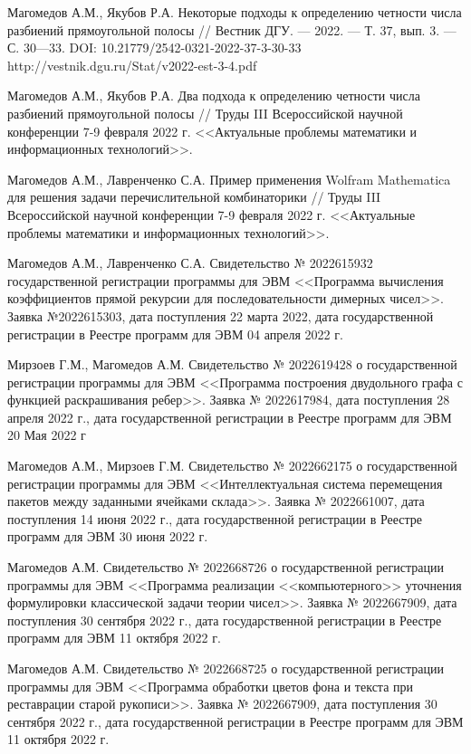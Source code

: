 \begin{thebibliography}{111}
Магомедов А.М., Якубов Р.А.
Некоторые подходы к определению четности числа разбиений прямоугольной полосы
//
Вестник ДГУ.
--- 2022.
--- Т. 37, вып. 3.
--- С. 30---33.
DOI: 10.21779/2542-0321-2022-37-3-30-33
http://vestnik.dgu.ru/Stat/v2022-est-3-4.pdf

Магомедов А.М., Якубов Р.А.
Два подхода к определению четности числа разбиений прямоугольной полосы
//
Труды III Всероссийской научной конференции 7-9 февраля 2022 г. <<Актуальные проблемы математики и информационных технологий>>.

Магомедов А.М., Лавренченко С.А.
Пример применения Wolfram Mathematica для решения задачи перечислительной комбинаторики
//
Труды III Всероссийской научной конференции 7-9 февраля 2022 г.  <<Актуальные проблемы математики и информационных технологий>>.

Магомедов А.М., Лавренченко С.А.
Свидетельство № 2022615932 государственной регистрации программы для ЭВМ <<Программа вычисления коэффициентов прямой рекурсии для последовательности димерных чисел>>. Заявка №2022615303, дата поступления 22 марта 2022, дата государственной регистрации в Реестре программ для ЭВМ 04 апреля 2022 г.

Мирзоев Г.М., Магомедов А.М.
Свидетельство № 2022619428 о государственной регистрации программы для ЭВМ <<Программа построения двудольного графа с функцией раскрашивания ребер>>. Заявка № 2022617984, дата поступления 28 апреля 2022 г., дата государственной регистрации в Реестре программ для ЭВМ 20 Мая 2022 г

Магомедов А.М., Мирзоев Г.М.
Свидетельство № 2022662175 о государственной регистрации программы для ЭВМ <<Интеллектуальная система перемещения пакетов между заданными ячейками склада>>. Заявка № 2022661007, дата поступления 14 июня 2022 г., дата государственной регистрации в Реестре программ для ЭВМ 30 июня 2022 г.

Магомедов А.М.
Свидетельство № 2022668726 о государственной регистрации программы для ЭВМ <<Программа реализации <<компьютерного>> уточнения формулировки классической задачи теории чисел>>. Заявка № 2022667909, дата поступления 30 сентября 2022 г., дата государственной регистрации в Реестре программ для ЭВМ 11 октября 2022 г.

Магомедов А.М.
Свидетельство № 2022668725 о государственной регистрации программы для ЭВМ <<Программа обработки цветов фона и текста при реставрации старой рукописи>>. Заявка № 2022667909, дата поступления 30 сентября 2022 г., дата государственной регистрации в Реестре программ для ЭВМ 11 октября 2022 г.


\end{thebibliography}
